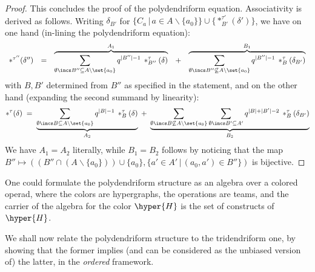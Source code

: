 \begin{proof}
This concludes the proof of the polydendriform equation.
Associativity is derived as follows. Writing $\delta_{B'}$ for $\{C_a\,|\,a\in A\backslash\{a_0\}\}\cup \{\ast^{\tau'}_{B'}(\delta')\}$, we have  on one hand (in-lining the polydendriform equation):
$$\begin{array}{lllll}
\ast^{\tau''}(\delta'') & = & \overbrace{\sum_{\emptyset\incs B''\subseteq A\backslash\set{a_0}} q^{{|B''|}-1} \:\ast^{\tau}_{B''}(\delta)}^{A_1} & +
& \overbrace{\sum_{\emptyset\incs B''\not\subseteq A\backslash\set{a_0}} q^{{|B''|}-1} \:\ast^{\tau}_B(\delta_{B'})}^{B_1}\\
\end{array}
$$
with $B,B'$ determined from $B''$ as specified in the statement, and on the other hand  (expanding the second summand by linearity):
$$
\ast^{\tau}(\delta)\; =\;  \underbrace{\sum_{\emptyset\incs B\subseteq A\backslash\set{a_0}} q^{{|B|}-1} \:\ast^{\tau}_{B}(\delta)}_{A_2} \; + \;
\underbrace{\sum_{\emptyset\incs B\not\subseteq A\backslash\set{a_0}}  \sum_{\emptyset\incs B'\subseteq A'}q^{|B|+|B'|-2} \:\ast^{\tau}_B(\delta_{B'})}_{B_2}
$$
We have $A_1=A_2$ literally, while $B_1=B_2$ follows by noticing that the map $B''\mapsto ((B''\cap(A\backslash\{a_0\}))\cup\{a_0\},\{a'\in A'\,|\, (a_0,a')\in B''\})$ is bijective. 
\end{proof}

 



\begin{remark} One could formulate the polydendriform structure as an algebra over a colored operad, where the colors are hypergraphs, the operations are teams, and the carrier of the algebra for the color $\hyper{H}$ is the set of constructs of $\hyper{H}$.
\end{remark}

We shall now relate the polydendriform structure to the tridendriform one, by showing that  the former implies (and can be considered as the unbiased version of) the latter, in the {\em ordered}   framework. 

